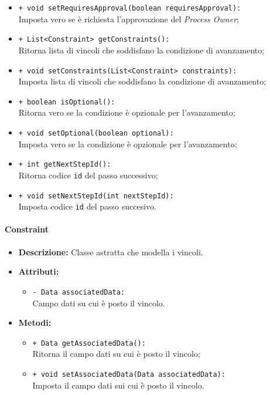 \begin{flushleft}
\begin{itemize}
\begin{sloppypar}
\begin{itemize}
\item \texttt{+ void setRequiresApproval(boolean requiresApproval):}\\ Imposta vero se è richiesta l'approvazione del \textit{Process Owner};
\item \texttt{+ List<Constraint> getConstraints():}\\ Ritorna lista di vincoli che soddisfano la condizione di avanzamento;
\item \texttt{+ void setConstraints(List<Constraint> constraints):}\\ Imposta lista di vincoli che soddisfano la condizione di avanzamento;
\item \texttt{+ boolean isOptional():}\\ Ritorna vero se la condizione è opzionale per l'avanzamento;
\item \texttt{+ void setOptional(boolean optional):}\\ Imposta vero se la condizione è opzionale per l'avanzamento;
\item \texttt{+ int getNextStepId():}\\ Ritorna codice \texttt{id} del passo successivo;
\item \texttt{+ void setNextStepId(int nextStepId):}\\ Imposta codice \texttt{id} del passo succesivo.
\end{itemize}
\end{sloppypar}
\end{itemize}
\end{flushleft}

\paragraph{Constraint}
\label{botconstraint}
\begin{flushleft}
\begin{itemize}
\item \textbf{Descrizione:} Classe astratta che modella i vincoli.
\item \textbf{Attributi:}
\begin{sloppypar}
\begin{itemize}
\item \texttt{- Data associatedData:}\\ Campo dati su cui è posto il vincolo.
\end{itemize}
\end{sloppypar}
\item \textbf{Metodi:}
\begin{sloppypar}
\begin{itemize}
\item \texttt{+ Data getAssociatedData():}\\ Ritorna il campo dati su cui è posto il vincolo;
\item \texttt{+ void setAssociatedData(Data associatedData):}\\ Imposta il campo dati sui cui è posto il vincolo.
\end{itemize}
\end{sloppypar}
\end{itemize}
\end{flushleft}

